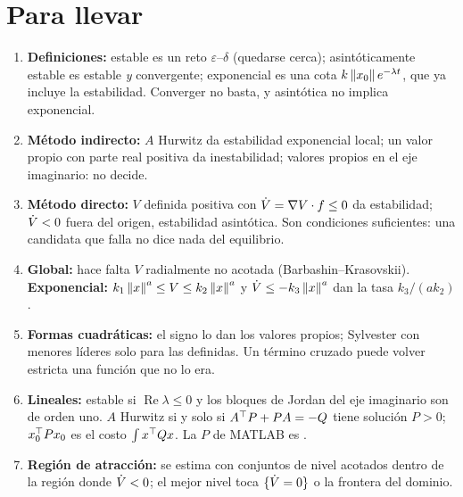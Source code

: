 \section{Para llevar}
\label{sec:ly-cierre}

\begin{parallevar}
\begin{enumerate}
  \item \textbf{Definiciones:} estable es un reto $\varepsilon$--$\delta$ (quedarse cerca); asintóticamente estable es estable \emph{y} convergente; exponencial es una cota $k\left\lVert x_0\right\rVert e^{-\lambda t}$, que ya incluye la estabilidad. Converger no basta, y asintótica no implica exponencial.
  \item \textbf{Método indirecto:} $A$ Hurwitz da estabilidad exponencial local; un valor propio con parte real positiva da inestabilidad; valores propios en el eje imaginario: no decide.
  \item \textbf{Método directo:} $V$ definida positiva con $\dot V=\nabla V\cdot f\le0$ da estabilidad; $\dot V<0$ fuera del origen, estabilidad asintótica. Son condiciones suficientes: una candidata que falla no dice nada del equilibrio.
  \item \textbf{Global:} hace falta $V$ radialmente no acotada (Barbashin--Krasovskii). \textbf{Exponencial:} $k_1\left\lVert x\right\rVert^a\le V\le k_2\left\lVert x\right\rVert^a$ y $\dot V\le-k_3\left\lVert x\right\rVert^a$ dan la tasa $k_3/(ak_2)$.
  \item \textbf{Formas cuadráticas:} el signo lo dan los valores propios; Sylvester con menores líderes solo para las definidas. Un término cruzado puede volver estricta una función que no lo era.
  \item \textbf{Lineales:} estable si $\operatorname{Re}\lambda\le0$ y los bloques de Jordan del eje imaginario son de orden uno. $A$ Hurwitz si y solo si $A^{\top} P+PA=-Q$ tiene solución $P>0$; $x_0^{\top} Px_0$ es el costo $\int x^{\top} Qx$. La $P$ de MATLAB es .
  \item \textbf{Región de atracción:} se estima con conjuntos de nivel acotados dentro de la región donde $\dot V<0$; el mejor nivel toca $\{\dot V=0\}$ o la frontera del dominio.
\end{enumerate}
\end{parallevar}

